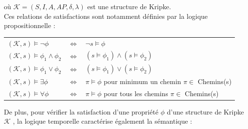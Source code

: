 \documentclass[runningheads,a4paper,10pt]{llncs}
\begin{document}
où $\mathcal{K} = (S,I,A,AP,\delta,\lambda)$ est une structure de Kripke.\\

Ces relations de satisfactions sont notamment définies par la logique propositionnelle : 

\begin{center}
\begin{tabular}{lll}
   $(\mathcal{K},s) \vDash \neg\phi$ & \hspace{0.5cm} $\Leftrightarrow$ \hspace{0.5cm} & $\neg s \vDash \phi$  \\
   $(\mathcal{K},s) \vDash \phi_{1} \wedge \phi_{2} $ & \hspace{0.5cm} $\Leftrightarrow$ \hspace{0.5cm} & $(s \vDash \phi_{1}) \wedge (s \vDash \phi_{2})$ \\
   $(\mathcal{K},s) \vDash \phi_{1} \vee \phi_{2} $ & \hspace{0.5cm} $\Leftrightarrow$ \hspace{0.5cm} & $(s \vDash \phi_{1}) \vee (s \vDash \phi_{2})$ \\
   $(\mathcal{K},s) \vDash \exists\phi$ & \hspace{0.5cm} $\Leftrightarrow$ \hspace{0.5cm} & $\pi \vDash \phi$ pour minimum un chemin $\pi \in$ Chemins(s) \\ 
   $(\mathcal{K},s) \vDash \forall\phi$ & \hspace{0.5cm} $\Leftrightarrow$ \hspace{0.5cm} & $\pi \vDash \phi$ pour tous les chemins $\pi \in$ Chemins(s) \\ 
\end{tabular}
\end{center}

De plus, pour vérifier la satisfaction d'une propriété $\phi$ d'une structure de Kripke $\mathcal{K}$ , la logique temporelle caractérise également la sémantique :
\end{document}
